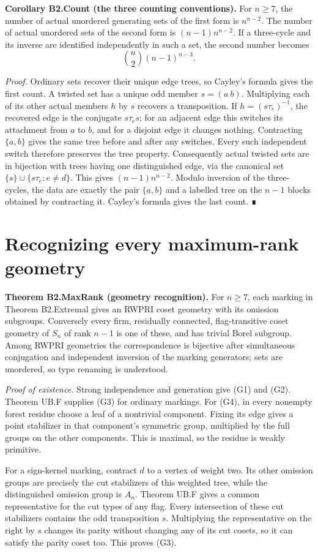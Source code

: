 \textbf{Corollary B2.Count (the three counting conventions).} For \(n\geq7\), the number of actual unordered generating sets of the first form is \(n^{n-2}\). The number of actual unordered sets of the second form is \((n-1)n^{n-2}\). If a three-cycle and its inverse are identified independently in such a set, the second number becomes \[
\binom n2(n-1)^{n-3}.
\]

\emph{Proof.} Ordinary sets recover their unique edge trees, so Cayley's formula gives the first count. A twisted set has a unique odd member \(s=(a\ b)\). Multiplying each of its other actual members \(h\) by \(s\) recovers a transposition. If \(h=(s\tau_e)^{-1}\), the recovered edge is the conjugate \(s\tau_es\); for an adjacent edge this switches its attachment from \(a\) to \(b\), and for a disjoint edge it changes nothing. Contracting \(\{a,b\}\) gives the same tree before and after any switches. Every such independent switch therefore preserves the tree property. Consequently actual twisted sets are in bijection with trees having one distinguished edge, via the canonical set \(\{s\}\cup\{s\tau_e:e\ne d\}\). This gives \((n-1)n^{n-2}\). Modulo inversion of the three-cycles, the data are exactly the pair \(\{a,b\}\) and a labelled tree on the \(n-1\) blocks obtained by contracting it. Cayley's formula gives the last count. ∎
\section{Recognizing every maximum-rank geometry}
\textbf{Theorem B2.MaxRank (geometry recognition).} For \(n\geq7\), each marking in Theorem B2.Extremal gives an RWPRI coset geometry with its omission subgroups. Conversely every firm, residually connected, flag-transitive coset geometry of \(S_n\) of rank \(n-1\) is one of these, and has trivial Borel subgroup. Among RWPRI geometries the correspondence is bijective after simultaneous conjugation and independent inversion of the marking generators; sets are unordered, so type renaming is understood.

\emph{Proof of existence.} Strong independence and generation give (G1) and (G2). Theorem UB.F supplies (G3) for ordinary markings. For (G4), in every nonempty forest residue choose a leaf of a nontrivial component. Fixing its edge gives a point stabilizer in that component's symmetric group, multiplied by the full groups on the other components. This is maximal, so the residue is weakly primitive.

For a sign-kernel marking, contract \(d\) to a vertex of weight two. Its other omission groups are precisely the cut stabilizers of this weighted tree, while the distinguished omission group is \(A_n\). Theorem UB.F gives a common representative for the cut types of any flag. Every intersection of these cut stabilizers contains the odd transposition \(s\). Multiplying the representative on the right by \(s\) changes its parity without changing any of its cut cosets, so it can satisfy the parity coset too. This proves (G3).

